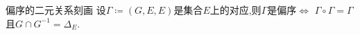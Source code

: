 \begin{proposition}{偏序的二元关系刻画}{}
	设$\Gamma\coloneq\left(G,E,E\right)$是集合$E$上的对应,则$\Gamma$是偏序$\iff$ $\Gamma\circ\Gamma=\Gamma$且$G\cap G^{-1}=\Delta_{E}$.
\end{proposition}











































































































































